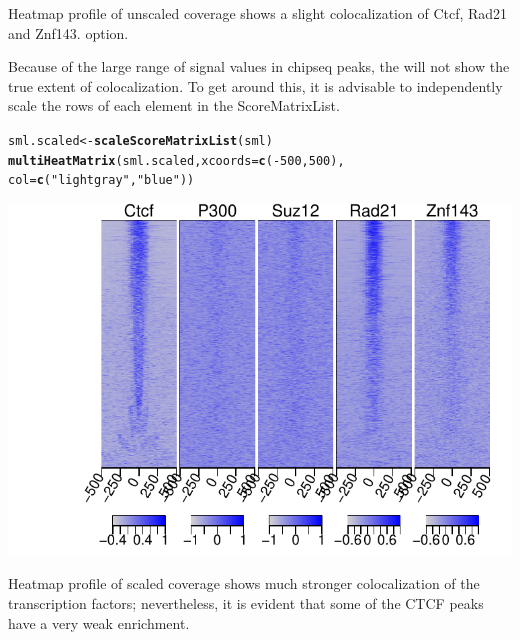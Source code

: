 \documentclass{article}\usepackage[]{graphicx}\usepackage[]{color}
\makeatletter
\newcommand{\hlnum}[1]{\textcolor[rgb]{0.686,0.059,0.569}{#1}}%
\newcommand{\hlstr}[1]{\textcolor[rgb]{0.192,0.494,0.8}{#1}}%
\newcommand{\hlopt}[1]{\textcolor[rgb]{0,0,0}{#1}}%
\newcommand{\hlstd}[1]{\textcolor[rgb]{0.345,0.345,0.345}{#1}}%
\newcommand{\hlkwb}[1]{\textcolor[rgb]{0.69,0.353,0.396}{#1}}%
\newcommand{\hlkwc}[1]{\textcolor[rgb]{0.333,0.667,0.333}{#1}}%
\newcommand{\hlkwd}[1]{\textcolor[rgb]{0.737,0.353,0.396}{\textbf{#1}}}%
\newenvironment{kframe}{%
 \def\at@end@of@kframe{}%
 \ifinner\ifhmode%
  \def\at@end@of@kframe{\end{minipage}}%
  \begin{minipage}{\columnwidth}%
 \fi\fi%
 \def\FrameCommand##1{\hskip\@totalleftmargin \hskip-\fboxsep
 \colorbox{shadecolor}{##1}\hskip-\fboxsep
     \hskip-\linewidth \hskip-\@totalleftmargin \hskip\columnwidth}%
 \MakeFramed {\advance\hsize-\width
   \@totalleftmargin\z@ \linewidth\hsize
   \@setminipage}}%
 {\par\unskip\endMakeFramed%
 \at@end@of@kframe}
\newenvironment{knitrout}{}{} %
\makeatother
\begin{document}
\begin{knitrout}
{}



\end{knitrout}

\caption{Heatmap profile of unscaled coverage shows a slight colocalization of Ctcf, Rad21 and Znf143.
option.\label{fig:ctcfScoreMatrixList}}

Because of the large range of signal values in chipseq peaks, the  
will not show the true extent of colocalization. To get around this, it is advisable
to independently scale the rows of each element in the ScoreMatrixList.

\begin{knitrout}
\color{fgcolor}\begin{kframe}
\begin{alltt}
\hlstd{sml.scaled} \hlkwb{<-} \hlkwd{scaleScoreMatrixList}\hlstd{(sml)}
\hlkwd{multiHeatMatrix}\hlstd{(sml.scaled,} \hlkwc{xcoords} \hlstd{=} \hlkwd{c}\hlstd{(}\hlopt{-}\hlnum{500}\hlstd{,} \hlnum{500}\hlstd{),}
    \hlkwc{col} \hlstd{=} \hlkwd{c}\hlstd{(}\hlstr{"lightgray"}\hlstd{,} \hlstr{"blue"}\hlstd{))}
\end{alltt}
\end{kframe}

{\centering \includegraphics[width=.8\linewidth]{inst/doc/FiguresplotScaledProfile} 

}



\end{knitrout}

\caption{Heatmap profile of scaled coverage shows much stronger colocalization of the transcription factors; nevertheless, it is evident that some of the CTCF peaks have a very weak enrichment.\label{fig:plotScaledProfile}}
\end{document}
